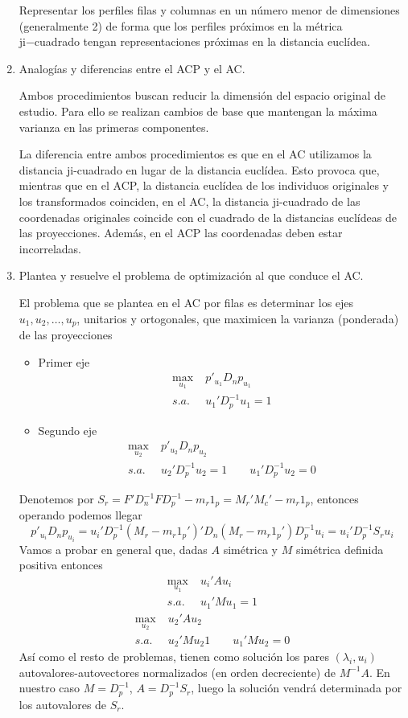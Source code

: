\documentclass[twoside]{article}
\begin{document}
\begin{enumerate}
Representar los perfiles filas y columnas en un número menor
de dimensiones (generalmente 2) de forma que los perfiles próximos en la métrica ji−cuadrado tengan representaciones próximas en la distancia euclídea.


\item Analogías y diferencias entre el ACP y el AC.

Ambos procedimientos buscan reducir la dimensión del espacio original de estudio. Para ello se realizan cambios de base que mantengan la máxima varianza en las primeras componentes.  

La diferencia entre ambos procedimientos es que en el AC utilizamos la distancia ji-cuadrado en lugar de la distancia euclídea. Esto provoca que, mientras que en el ACP, la distancia euclídea de los individuos originales y los transformados coinciden, en el AC, la distancia ji-cuadrado de las coordenadas originales coincide con el cuadrado de la distancias euclídeas de las proyecciones. Además, en el ACP las coordenadas deben estar incorreladas. 

\item Plantea y resuelve el problema de optimización al que conduce el AC. 

El problema que se plantea en el AC por filas es determinar los ejes $u_1, u_2,\dotsc, u_p$, unitarios y ortogonales, que maximicen la varianza (ponderada) de las proyecciones
\begin{itemize}
\item Primer eje
\begin{align*}
\max_{u_1} &\; p'_{u_1}D_np_{u_1} \\
s.a.&\; u_1'D_p^{-1}u_1 = 1
\end{align*}
\item Segundo eje
\begin{align*}
\max_{u_2} &\; p'_{u_2}D_n p_{u_2} \\
s.a.& \;u_2'D_p^{-1}u_2 = 1 \qquad u_1'D_p^{-1}u_2 = 0 
\end{align*}
\end{itemize}

Denotemos por $S_r = F'D_n^{-1}FD_p^{-1}-m_r1_p = M_r'M_c'-m_r1_p$, entonces operando podemos llegar
$$
p'_{u_i}D_np_{u_i} = u_i'D_p^{-1}(M_r -m_r1_p')'D_n(M_r -m_r1_p')D_p^{-1}u_i = u_i'D_p^{-1}S_ru_i
$$
Vamos a probar en general que, dadas $A$ simétrica y $M$ simétrica definida positiva entonces
\begin{align*}
\max_{u_1} &\;  u_i'Au_i \\
s.a.&\;  u_1'Mu_1 = 1
\end{align*}
\begin{align*}
\max_{u_2} &\;  u_2'Au_2 \\
s.a.& \; u_2'Mu_2  1 \qquad u_1'Mu_2 = 0 
\end{align*}
Así como el resto de problemas, tienen como solución los pares $(\lambda_i,u_i)$ autovalores-autovectores normalizados (en orden decreciente) de $M^{-1}A$. En nuestro caso $M=D_p^{-1}$, $A = D^{-1}_p S_r$, luego la solución vendrá determinada por los autovalores de $S_r$.


\end{enumerate}
\end{document}
